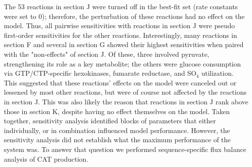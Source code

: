 \documentclass[12pt]{article}
\begin{document}
The 53 reactions in section J were turned off in the best-fit set (rate constants were set to 0);
therefore, the perturbation of these reactions had no effect on the model.
Thus, all pairwise sensitivities with reactions in section J were pseudo first-order sensitivities for the other reactions.
Interestingly, many reactions in section F and several in section G showed their highest sensitivities when paired with the "non-effects" of section J.
Of these, three involved pyruvate, strengthening its role as a key metabolite; the others were glucose consumption via GTP/CTP-specific hexokinases,
fumarate reductase, and SO$_4$ utilization.
This suggested that these reactions' effects on the model were canceled out or lessened by most other reactions, but were of course not affected by the reactions in section J.
This was also likely the reason that reactions in section J rank above those in section K, despite having no effect themselves on the model.
Taken together, sensitivity analysis identified blocks of parameters that either individually, or in combination influenced model performance.
However, the sensitivity analysis did not establish what the maximum performance of the system was.
To answer that question we performed sequence-specific flux balance analysis of CAT production.
\end{document}
